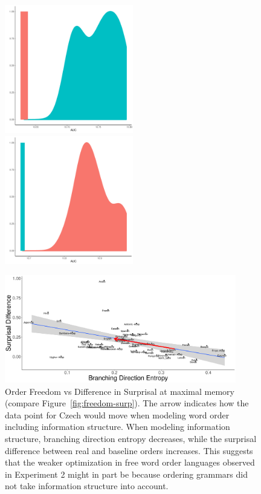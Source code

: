	
\begin{figure}
\includegraphics[width=0.5\textwidth]{writeup/figures/Czech-PDT-listener-surprisal-memory-HIST_AUC_onlyWordForms_boundedVocab_REAL-infostruc_GROUND.pdf}
\includegraphics[width=0.5\textwidth]{writeup/figures/Czech-PDT-listener-surprisal-memory-HIST_AUC_onlyWordForms_boundedVocab_REAL-infostruc_REAL.pdf}

	\caption{}\label{fig:median-czech-infostruc}
\end{figure}





\begin{figure}
\includegraphics[width=0.9\textwidth]{figures/surprisal-branching-entropy-REAL-infostruc-invert.pdf}
	\caption{Order Freedom vs Difference in Surprisal at maximal memory (compare Figure~\ref{fig:freedom-surp}). The arrow indicates how the data point for Czech would move when modeling word order including information structure.
	When modeling information structure, branching direction entropy decreases, while the surprisal difference between real and baseline orders increases.
	This suggests that the weaker optimization in free word order languages observed in Experiment 2 might in part be because ordering grammars did not take information structure into account.
	}\label{fig:freedom-mi-with-infostruc}
\end{figure}




